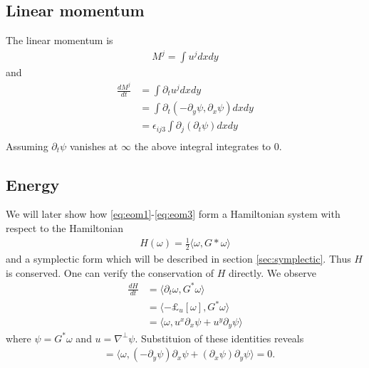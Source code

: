 \documentclass[12pt]{amsart}
\begin{document}
\subsection{Linear momentum}
\label{sec:linear}
The linear momentum is
\begin{align*}
  M^j = \int u^j dx dy
\end{align*}
and
\begin{align*}
  \frac{dM^j}{dt} &= \int \partial_t u^j dxdy \\
  &= \int  \partial_t (-\partial_y \psi , \partial_x \psi) dxdy \\
  &= \epsilon_{ij3} \int \partial_j( \partial_t \psi) dx dy \\
\end{align*}
Assuming $\partial_t \psi$ vanishes at $\infty$ the above integral integrates to $0$.

\subsection{Energy}
\label{sec:energy}
We will later show how \eqref{eq:eom1}-\eqref{eq:eom3} form a Hamiltonian system with respect to the Hamiltonian
\begin{align*}
  H(\omega) = \frac{1}{2} \langle \omega , G* \omega\rangle
\end{align*}
and a symplectic form which will be described in section \ref{sec:symplectic}.
Thus $H$ is conserved.
One can verify the conservation of $H$ directly.  We observe
\begin{align*}
  \frac{dH}{dt} &= \langle \partial_t \omega, G^* \omega \rangle \\
  &= \langle - \pounds_u [\omega] , G^* \omega \rangle \\
  &= \langle \omega , u^x \partial_x \psi + u^y \partial_y \psi \rangle
\end{align*}
where $\psi = G^*\omega$ and $u = \nabla^\perp \psi$.
Substituion of these identities reveals
\begin{align*}
  &= \langle \omega , (-\partial_y \psi) \partial_x \psi + (\partial_x \psi)  \partial_y \psi \rangle = 0.
\end{align*}
\end{document}
